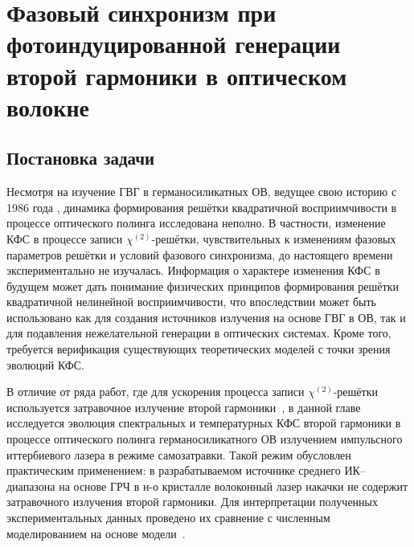 \chapter{Фазовый синхронизм при фотоиндуцированной генерации второй гармоники в оптическом волокне}\label{ch:nonlin2}

\section{Постановка задачи}

Несмотря на изучение ГВГ в германосиликатных ОВ, ведущее свою историю с 1986 года \cite{osterberg1986dye}, динамика формирования решётки квадратичной восприимчивости в процессе оптического полинга исследована неполно. В частности, изменение КФС в процессе записи \(\chi^{(2)}\)-решётки, чувствительных к изменениям фазовых параметров решётки и условий фазового синхронизма, до настоящего времени экспериментально не изучалась. Информация о характере изменения КФС в будущем может дать понимание физических принципов формирования решётки квадратичной нелинейной восприимчивости, что впоследствии может быть использовано как для создания источников излучения на основе ГВГ в ОВ, так и для подавления нежелательной генерации в оптических системах. Кроме того, требуется верификация существующих теоретических моделей с точки зрения эволюций КФС.


В отличие от ряда работ, где для ускорения процесса записи \(\chi^{(2)}\)-решётки используется затравочное излучение второй гармоники~\cite{stolen1987self}, в данной главе исследуется эволюция спектральных и температурных КФС второй гармоники в процессе оптического полинга германосиликатного ОВ излучением импульсного иттербиевого лазера в режиме самозатравки. Такой режим обусловлен практическим применением: в разрабатываемом источнике среднего ИК--диапазона на основе ГРЧ в н-о кристалле волоконный лазер накачки не содержит затравочного излучения второй гармоники. Для интерпретации полученных экспериментальных данных проведено их сравнение с численным моделированием на основе модели~\cite{antonyuk2001self}.

